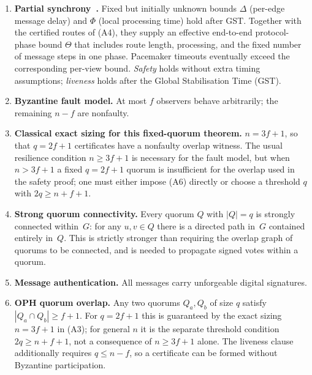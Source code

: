 \begin{enumerate}[(A1)]
  \item \textbf{Partial synchrony~\cite{DLS88}.}
        Fixed but initially unknown bounds $\Delta$ (per-edge message delay)
        and $\Phi$ (local processing time) hold after \textrm{GST}. Together
        with the certified routes of (A4), they supply an effective
        end-to-end protocol-phase bound \(\Theta\) that includes route length,
        processing, and the fixed number of message steps in one phase.
        Pacemaker timeouts eventually exceed the corresponding per-view
        bound.
        \emph{Safety} holds without extra timing assumptions;
        \emph{liveness} holds after the Global Stabilisation Time (\textrm{GST}).
  \item \textbf{Byzantine fault model.}
        At most $f$ observers behave arbitrarily; the remaining $n-f$ are nonfaulty.
  \item \textbf{Classical exact sizing for this fixed-quorum theorem.}
        $n = 3f+1$, so that $q=2f+1$ certificates have a nonfaulty overlap
        witness.  The usual resilience condition $n\ge 3f+1$ is necessary for
        the fault model, but when $n>3f+1$ a fixed $q=2f+1$ quorum is
        insufficient for the overlap used in the safety proof; one must either
        impose (A6) directly or choose a threshold $q$ with
        $2q\ge n+f+1$.
  \item \textbf{Strong quorum connectivity.}
        Every quorum $Q$ with $|Q|=q$ is strongly connected within~$G$:
        for any $u,v\in Q$ there is a directed path in~$G$ contained
        entirely in~$Q$.
        This is strictly stronger than requiring the overlap graph of
        quorums to be connected, and is needed to propagate signed votes
        within a quorum.
  \item \textbf{Message authentication.}
        All messages carry unforgeable digital signatures.
  \item \textbf{OPH quorum overlap.}
        Any two quorums $Q_a, Q_b$ of size $q$ satisfy
        $|Q_a\cap Q_b|\geq f+1$.  For $q=2f+1$ this is guaranteed by the
        exact sizing $n=3f+1$ in (A3); for general $n$ it is the separate
        threshold condition $2q\ge n+f+1$, not a consequence of
        $n\ge3f+1$ alone.  The liveness clause additionally requires
        \(q\le n-f\), so a certificate can be formed without Byzantine
        participation.
\end{enumerate}

